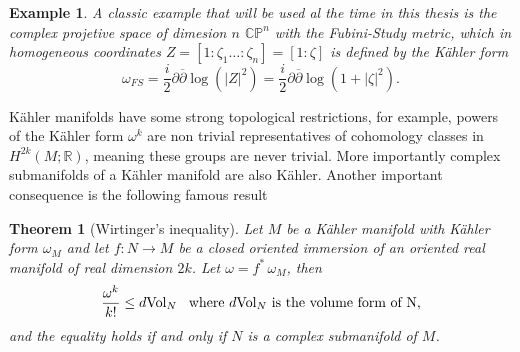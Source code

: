 \documentclass[12pt,twoside,a4paper]{report}
\newtheorem{theorem}{Theorem}[section]
\newtheorem{example}{Example}
\newcommand{\cp}{\ensuremath{\mathbb{CP}}}
\newcommand{\re}{\ensuremath{\mathbb R }}
\begin{document}
\begin{example}
  A classic example that will be used al the time in this thesis is the complex projetive space of dimesion $n$ $\cp^{n}$ with the Fubini-Study metric, which in homogeneous coordinates $Z=[1:\zeta_{1}\dots:\zeta_{n}]=[1:\zeta]$ is defined by the Kähler form
  \[
    \omega_{FS}=\frac{i}{2}\partial \overline{\partial}\log(|Z|^{2})=\frac{i}{2}\partial \overline{\partial}\log(1+|\zeta|^{2}).
  \]
\end{example}
Kähler manifolds have some strong topological restrictions, for example, powers of the Kähler form $\omega^k$ are non trivial representatives of cohomology classes in $H^{2k}(M ;\re)$, meaning these groups are never trivial. More importantly complex submanifolds of a Kähler manifold are also K\"ahler.
Another important consequence is the following famous result
\begin{theorem}[Wirtinger's inequality]
        Let $M$ be a Kähler manifold with Kähler form $\omega_M$ and let $f:N\rightarrow M$ be a closed oriented immersion
        of an oriented real manifold of real dimension $2k$. Let $\omega=f^*\,\omega_M$, then
        \begin{equation}
                        \frac{\omega^k}{k!}\leq d\textrm{Vol}_N\hspace{0.3cm}\text{where }d\textrm{Vol}_N\text{ is the volume form of N,}
        \end{equation}
        and the equality holds if and only if $N$ is a complex submanifold of $M$.
\end{theorem}
\end{document}
